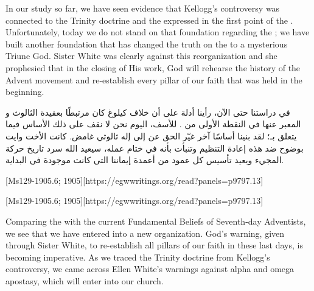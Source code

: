 



In our study so far, we have seen evidence that Kellogg’s controversy was connected to the Trinity doctrine and the  expressed in the first point of the . Unfortunately, today we do not stand on that foundation regarding the ; we have built another foundation that has changed the truth on the  to a mysterious Triune God. Sister White was clearly against this reorganization and she prophesied that in the closing of His work, God will rehearse the history of the Advent movement and re-establish every pillar of our faith that was held in the beginning.


في دراستنا حتى الآن، رأينا أدلة على أن خلاف كيلوغ كان مرتبطًا بعقيدة الثالوث و المعبر عنها في النقطة الأولى من . للأسف، اليوم نحن لا نقف على ذلك الأساس فيما يتعلق بـ؛ لقد بنينا أساسًا آخر غيّر الحق عن  إلى إله ثالوثي غامض. كانت الأخت وايت بوضوح ضد هذه إعادة التنظيم وتنبأت بأنه في ختام عمله، سيعيد الله سرد تاريخ حركة المجيء ويعيد تأسيس كل عمود من أعمدة إيماننا التي كانت موجودة في البداية.


[Ms129-1905.6; 1905][https://egwwritings.org/read?panels=p9797.13]


[Ms129-1905.6; 1905][https://egwwritings.org/read?panels=p9797.13]


Comparing the  with the current Fundamental Beliefs of Seventh-day Adventists, we see that we have entered into a new organization. God’s warning, given through Sister White, to re-establish all pillars of our faith in these last days, is becoming imperative. As we traced the Trinity doctrine from Kellogg's controversy, we came across Ellen White’s warnings against alpha and omega apostasy, which will enter into our church.


